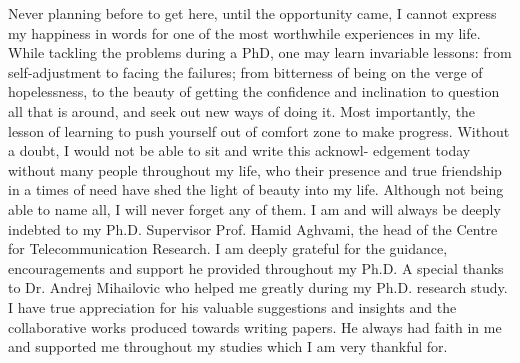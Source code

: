 
\begin{acknowledgements}      


Never planning before to get here, until the opportunity came, I cannot express my happiness in words for one of the most worthwhile experiences in my life. While tackling the problems during a PhD, one may learn invariable lessons: from self-adjustment to facing the failures; from bitterness of being on the verge of hopelessness, to the beauty of getting the confidence and inclination to question all that is around, and seek out new ways of doing it. Most importantly, the lesson of learning to push yourself out of comfort zone to make progress.
Without a doubt, I would not be able to sit and write this acknowl- edgement today without many people throughout my life, who their presence and true friendship in a times of need have shed the light of beauty into my life. Although not being able to name all, I will never forget any of them.
I am and will always be deeply indebted to my Ph.D. Supervisor Prof. Hamid Aghvami, the head of the Centre for Telecommunication Research. I am deeply grateful for the guidance, encouragements and support he provided throughout my Ph.D.
A special thanks to Dr. Andrej Mihailovic who helped me greatly during my Ph.D. research study. I have true appreciation for his valuable suggestions and insights and the collaborative works produced towards writing papers. He always had faith in me and supported me throughout my studies which I am very thankful for.

\end{acknowledgements}
